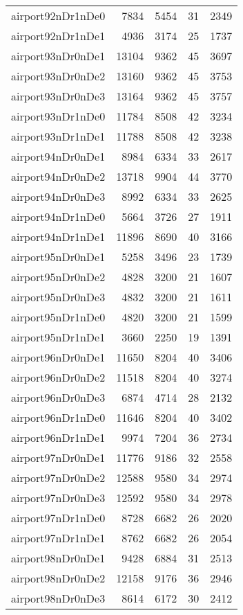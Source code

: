 \begin{tabular}{lrrrr}
airport92nDr1nDe0 & 7834 & 5454 & 31 & 2349 \\
airport92nDr1nDe1 & 4936 & 3174 & 25 & 1737 \\
airport93nDr0nDe1 & 13104 & 9362 & 45 & 3697 \\
airport93nDr0nDe2 & 13160 & 9362 & 45 & 3753 \\
airport93nDr0nDe3 & 13164 & 9362 & 45 & 3757 \\
airport93nDr1nDe0 & 11784 & 8508 & 42 & 3234 \\
airport93nDr1nDe1 & 11788 & 8508 & 42 & 3238 \\
airport94nDr0nDe1 & 8984 & 6334 & 33 & 2617 \\
airport94nDr0nDe2 & 13718 & 9904 & 44 & 3770 \\
airport94nDr0nDe3 & 8992 & 6334 & 33 & 2625 \\
airport94nDr1nDe0 & 5664 & 3726 & 27 & 1911 \\
airport94nDr1nDe1 & 11896 & 8690 & 40 & 3166 \\
airport95nDr0nDe1 & 5258 & 3496 & 23 & 1739 \\
airport95nDr0nDe2 & 4828 & 3200 & 21 & 1607 \\
airport95nDr0nDe3 & 4832 & 3200 & 21 & 1611 \\
airport95nDr1nDe0 & 4820 & 3200 & 21 & 1599 \\
airport95nDr1nDe1 & 3660 & 2250 & 19 & 1391 \\
airport96nDr0nDe1 & 11650 & 8204 & 40 & 3406 \\
airport96nDr0nDe2 & 11518 & 8204 & 40 & 3274 \\
airport96nDr0nDe3 & 6874 & 4714 & 28 & 2132 \\
airport96nDr1nDe0 & 11646 & 8204 & 40 & 3402 \\
airport96nDr1nDe1 & 9974 & 7204 & 36 & 2734 \\
airport97nDr0nDe1 & 11776 & 9186 & 32 & 2558 \\
airport97nDr0nDe2 & 12588 & 9580 & 34 & 2974 \\
airport97nDr0nDe3 & 12592 & 9580 & 34 & 2978 \\
airport97nDr1nDe0 & 8728 & 6682 & 26 & 2020 \\
airport97nDr1nDe1 & 8762 & 6682 & 26 & 2054 \\
airport98nDr0nDe1 & 9428 & 6884 & 31 & 2513 \\
airport98nDr0nDe2 & 12158 & 9176 & 36 & 2946 \\
airport98nDr0nDe3 & 8614 & 6172 & 30 & 2412 \\

\end{tabular}
